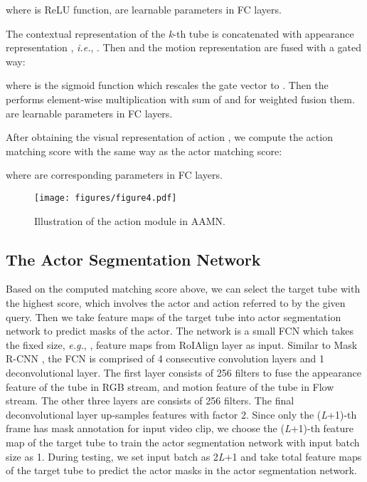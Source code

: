 \documentclass[journal]{IEEEtran}
\begin{document}
where  is ReLU function,  are learnable parameters in FC layers.

The contextual representation  of the \emph{k}-th tube is concatenated with appearance representation , \emph{i.e.},  . Then  and the motion representation  are fused with a gated way:

where  is the sigmoid function which rescales the gate vector  to . Then the  performs element-wise multiplication with sum of  and  for weighted fusion them.  are learnable parameters in FC layers.

After obtaining the visual representation of action  , we compute the action matching score with the same way as the actor matching score:

where  are corresponding parameters in FC layers.

\begin{figure}[!t]
\centering
\texttt{[image: figures/figure4.pdf]}
\caption{Illustration of the action module in AAMN.}
\label{fig:action module}
\vspace{-0.2cm}
\end{figure}

\subsection{The Actor Segmentation Network}
\label{section: segmentation_network}

Based on the computed matching score   above, we can select the target tube with the highest score, which involves the actor and action referred to by the given query. Then we take  feature maps of the target tube into actor segmentation network to predict masks of the actor. The network is a small FCN which takes the fixed size, \emph{e.g.}, , feature maps from RoIAlign layer as input. Similar to Mask R-CNN \cite{he2017mask}, the FCN is comprised of 4 consecutive convolution layers and 1 deconvolutional layer. The first layer consists of 256  filters to fuse the appearance feature of the tube in RGB stream, and motion feature of the tube in Flow stream. The other three layers are consists of 256  filters. The final deconvolutional layer up-samples features with factor 2. Since only the (\emph{L}+1)-th frame has mask annotation for input video clip, we choose the (\emph{L}+1)-th feature map of the target tube to train the actor segmentation network with input batch size as 1. During testing, we set input batch as 2\emph{L}+1 and take total feature maps of the target tube to predict the actor masks in the actor segmentation network.
\end{document}
